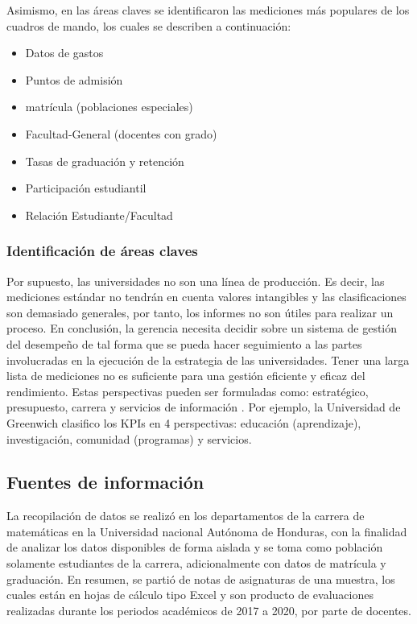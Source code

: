 \documentclass[12pt,jou]{apa7}
\begin{document}
Asimismo, en las áreas claves se identificaron las mediciones más populares de los cuadros de mando, los cuales se describen a continuación:
\begin{itemize}
	\item   Datos de gastos
	\item	Puntos de admisión
	\item	matrícula (poblaciones especiales)
	\item	Facultad-General (docentes con grado)
	\item	Tasas de graduación y retención
	\item	Participación estudiantil
	\item	Relación Estudiante/Facultad\\
\end{itemize}



\subsubsection{Identificación de áreas claves}
 Por supuesto, las universidades no son una línea de producción. Es decir, las mediciones estándar no tendrán en cuenta valores intangibles y las clasificaciones son demasiado generales, por tanto, los informes no son útiles para realizar un proceso. En conclusión, la gerencia necesita decidir sobre un sistema de gestión del desempeño de tal forma que se pueda hacer seguimiento a las partes involucradas en la ejecución de la estrategia de las universidades. Tener una larga lista de mediciones no es suficiente para una gestión eficiente y eficaz del rendimiento. Estas perspectivas pueden ser formuladas como: estratégico, presupuesto, carrera y servicios de información \cite{bscd}. Por ejemplo, la Universidad de Greenwich clasifico los KPIs en 4 perspectivas: educación (aprendizaje),  investigación, comunidad (programas) y servicios.



\subsection{Fuentes de información}
La recopilación de datos se realizó en los departamentos de la carrera de matemáticas en la Universidad nacional Autónoma de Honduras, con la finalidad de analizar los datos disponibles de forma aislada y se toma como población solamente estudiantes de la carrera, adicionalmente con datos de matrícula y graduación. En resumen, se partió de notas de asignaturas de una muestra, los cuales están en hojas de cálculo tipo Excel y son producto de evaluaciones realizadas durante los periodos académicos de 2017 a 2020, por parte de docentes.
\end{document}
